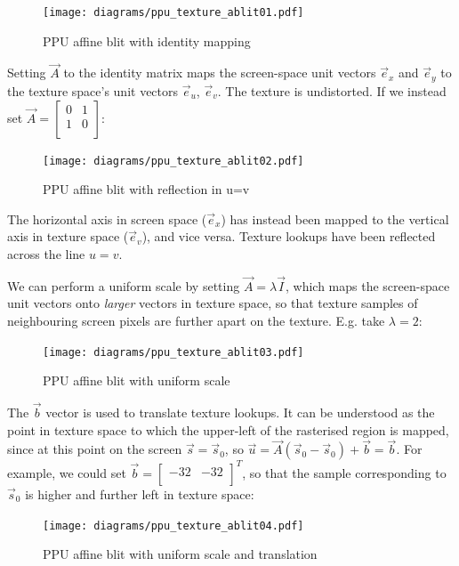 \begin{figure}[H]
\centering
\caption{PPU affine blit with identity mapping}
\label{diagram:ppu_texture_ablit01}
\texttt{[image: diagrams/ppu\_texture\_ablit01.pdf]}
\end{figure}

Setting $\vec{A}$ to the identity matrix maps the screen-space unit vectors $\vec{e}_x$ and $\vec{e}_y$ to the texture space's unit vectors $\vec{e}_u$, $\vec{e}_v$. The texture is undistorted. If we instead set $\vec{A} = \begin{bmatrix} 0 & 1 \\ 1 & 0 \\ \end{bmatrix}$:

\begin{figure}[H]
\centering
\caption{PPU affine blit with reflection in u=v}
\label{diagram:ppu_texture_ablit02}
\texttt{[image: diagrams/ppu\_texture\_ablit02.pdf]}
\end{figure}

The horizontal axis in screen space ($\vec{e}_x$) has instead been mapped to the vertical axis in texture space ($\vec{e}_v$), and vice versa. Texture lookups have been reflected across the line $u=v$.

We can perform a uniform scale by setting $\vec{A} = \lambda \vec{I}$, which maps the screen-space unit vectors onto {\it larger} vectors in texture space, so that texture samples of neighbouring screen pixels are further apart on the texture. E.g. take $\lambda=2$:

\begin{figure}[H]
\centering
\caption{PPU affine blit with uniform scale}
\label{diagram:ppu_texture_ablit03}
\texttt{[image: diagrams/ppu\_texture\_ablit03.pdf]}
\end{figure}

The $\vec{b}$ vector is used to translate texture lookups. It can be understood as the point in texture space to which the upper-left of the rasterised region is mapped, since at this point on the screen $\vec{s} = \vec{s}_0$, so $\vec{u} = \vec{A}(\vec{s}_0 - \vec{s}_0) + \vec{b} = \vec{b}$. For example, we could set $\vec{b} = \begin{bmatrix} -32 & -32 \\ \end{bmatrix}^T$, so that the sample corresponding to $\vec{s}_0$ is higher and further left in texture space:

\begin{figure}[H]
\centering
\caption{PPU affine blit with uniform scale and translation}
\label{diagram:ppu_texture_ablit04}
\texttt{[image: diagrams/ppu\_texture\_ablit04.pdf]}
\end{figure}

